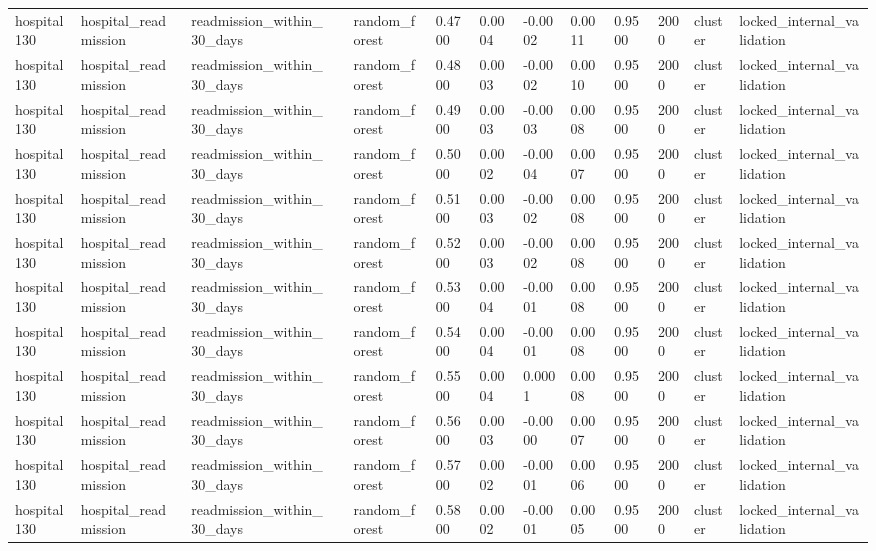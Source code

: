 \begin{tabular}{lllllllllllll}
hospital130 & hospital\_readmission & readmission\_within\_30\_days &  & random\_forest & 0.4700 & 0.0004 & -0.0002 & 0.0011 & 0.9500 & 2000 & cluster & locked\_internal\_validation \\
hospital130 & hospital\_readmission & readmission\_within\_30\_days &  & random\_forest & 0.4800 & 0.0003 & -0.0002 & 0.0010 & 0.9500 & 2000 & cluster & locked\_internal\_validation \\
hospital130 & hospital\_readmission & readmission\_within\_30\_days &  & random\_forest & 0.4900 & 0.0003 & -0.0003 & 0.0008 & 0.9500 & 2000 & cluster & locked\_internal\_validation \\
hospital130 & hospital\_readmission & readmission\_within\_30\_days &  & random\_forest & 0.5000 & 0.0002 & -0.0004 & 0.0007 & 0.9500 & 2000 & cluster & locked\_internal\_validation \\
hospital130 & hospital\_readmission & readmission\_within\_30\_days &  & random\_forest & 0.5100 & 0.0003 & -0.0002 & 0.0008 & 0.9500 & 2000 & cluster & locked\_internal\_validation \\
hospital130 & hospital\_readmission & readmission\_within\_30\_days &  & random\_forest & 0.5200 & 0.0003 & -0.0002 & 0.0008 & 0.9500 & 2000 & cluster & locked\_internal\_validation \\
hospital130 & hospital\_readmission & readmission\_within\_30\_days &  & random\_forest & 0.5300 & 0.0004 & -0.0001 & 0.0008 & 0.9500 & 2000 & cluster & locked\_internal\_validation \\
hospital130 & hospital\_readmission & readmission\_within\_30\_days &  & random\_forest & 0.5400 & 0.0004 & -0.0001 & 0.0008 & 0.9500 & 2000 & cluster & locked\_internal\_validation \\
hospital130 & hospital\_readmission & readmission\_within\_30\_days &  & random\_forest & 0.5500 & 0.0004 & 0.0001 & 0.0008 & 0.9500 & 2000 & cluster & locked\_internal\_validation \\
hospital130 & hospital\_readmission & readmission\_within\_30\_days &  & random\_forest & 0.5600 & 0.0003 & -0.0000 & 0.0007 & 0.9500 & 2000 & cluster & locked\_internal\_validation \\
hospital130 & hospital\_readmission & readmission\_within\_30\_days &  & random\_forest & 0.5700 & 0.0002 & -0.0001 & 0.0006 & 0.9500 & 2000 & cluster & locked\_internal\_validation \\
hospital130 & hospital\_readmission & readmission\_within\_30\_days &  & random\_forest & 0.5800 & 0.0002 & -0.0001 & 0.0005 & 0.9500 & 2000 & cluster & locked\_internal\_validation \\

\end{tabular}
